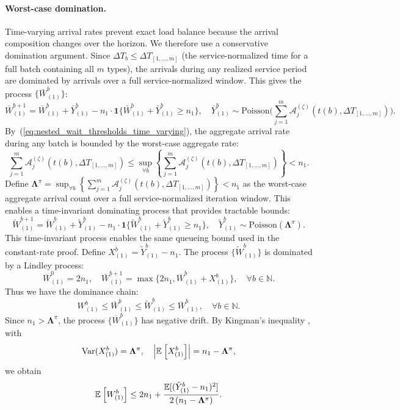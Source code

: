 \paragraph{Worst-case domination.} Time-varying arrival rates prevent exact load balance because the arrival composition changes over the horizon. We therefore use a conservative domination argument. Since $\Delta T_b\leq \Delta T_{[1,\dots,m]}$ (the service-normalized time for a full batch containing all $m$ types), the arrivals during any realized service period are dominated by arrivals over a full service-normalized window. This gives the process $\{\bar{W}_{(1)}^{b}\}$:
$$ \bar{W}_{(1)}^{b+1} = \bar{W}_{(1)}^{b} + \bar{Y}_{(1)}^b  - n_1 \cdot \mathbf{1}\{ \bar{W}_{(1)}^{b} + \bar{Y}_{(1)}^b \geq n_1 \},  \quad \bar{Y}_{(1)}^b \sim \text{Poisson}\Big(  \sum_{j=1}^m \mathcal A_j^{(\zeta)}(t(b),\Delta T_{[1,\dots,m]}) \Big).  $$
By~(\ref{eq:nested_wait_thresholds_time_varying}), the aggregate arrival rate during any batch is bounded by the worst-case aggregate rate:
$$ \sum_{j=1}^m \mathcal A_j^{(\zeta)}(t(b),\Delta T_{[1,\dots,m]}) \leq \sup_{\forall b}\left\{\sum_{j=1}^m \mathcal A_j^{(\zeta)}(t(b),\Delta T_{[1,\dots,m]}) \right\} < n_1.$$
Define $\mathbf{\Lambda}^{\pi} = \sup_{\forall b}\left\{\sum_{j=1}^m \mathcal A_j^{(\zeta)}(t(b),\Delta T_{[1,\dots,m]}) \right\} < n_1$ as the worst-case aggregate arrival count over a full service-normalized iteration window. This enables a time-invariant dominating process that provides tractable bounds:
$$ \tilde{W}_{(1)}^{b+1} = \tilde{W}_{(1)}^{b} + \tilde{Y}_{(1)}^b  - n_1 \cdot \mathbf{1}\{ \tilde{W}_{(1)}^{b} + \tilde{Y}_{(1)}^b \geq n_1 \},  \quad \tilde{Y}_{(1)}^b \sim \text{Poisson}(\mathbf{\Lambda}^{\pi}).  $$
This time-invariant process enables the same queueing bound used in the constant-rate proof. Define $X_{(1)}^b = \tilde{Y}_{(1)}^b - n_1$. The process $\{ \tilde{W}_{(1)}^{b}\}$ is dominated by a Lindley process:
$$ \overline{W}_{(1)}^{0} = 2n_1,\quad  \overline{W}_{(1)}^{b+1} = \max \{  2n_1, \overline{W}_{(1)}^{b} + X_{(1)}^b \},\quad \forall b \in \mathbb{N}. $$
Thus we have the dominance chain:
$$ W_{(1)}^{b}\leq \bar{W}_{(1)}^{b} \leq \tilde{W}_{(1)}^{b} \leq \overline{W}_{(1)}^{b}, \quad \forall b \in \mathbb{N}.$$
Since $n_1> \mathbf{\Lambda}^{\pi}$, the process $\{\overline{W}_{(1)}^{b} \}$ has negative drift. By Kingman's inequality \citep{kingman1962queues}, with
$$\text{Var}(X_{(1)}^b ) = \mathbf{\Lambda}^{\pi},\quad \left|  \mathbb{E}_{}\left[X_{(1)}^b\right] \right| = n_1 - \mathbf{\Lambda}^{\pi},$$
we obtain
$$  \mathbb{E}_{}\left[W_{(1)}^b\right]\leq  2n_1 + \frac{\mathbb{E}[(\tilde{Y}_{(1)}^b-n_1)^2]}{2\left(n_1 -\mathbf{\Lambda}^{\pi}\right)}. $$

